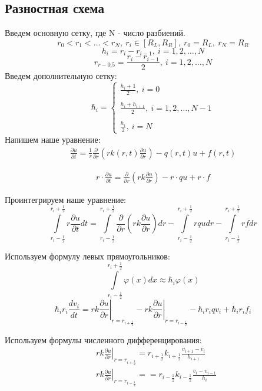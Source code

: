 \subsection{Разностная схема}
Введем основную сетку, где N - число разбиений.
\[ 
  r_0 < r_1 < \dots < r_N,\ r_i \in [R_L, R_R],\ r_0 = R_L,\ r_N = R_R
\]
\[
  h_i =r_i - r_{i-1},\ i=1,2, \dots, N
\]
\[
  r_{r-0.5} = \frac{r_i - r_{i-1}}{2},\ i=1,2, \dots, N
\]
Введем дополнительную сетку:
\[
  \hbar_i = \begin{cases}
    \frac{h_i + 1}{2},\ i = 0 \\ \\
    \frac{h_i + h_{i+1}}{2},\ i = 1, 2, \dots, N-1 \\ \\
    \frac{h_i}{2},\ i = N
  \end{cases}
\]
Напишем наше уравнение:
\begin{align*}
  \frac{\partial u}{\partial t} = \frac{1}{r} \frac{\partial}{\partial r}
  \left ( rk(r, t)\frac{\partial u}{\partial r} \right ) - q(r, t)u + f(r,t)
\end{align*}

\begin{align*}
  r \cdot \frac{\partial u}{\partial t} = \frac{\partial}{\partial r}
  \left ( rk\frac{\partial u}{\partial r} \right ) - r \cdot qu + r \cdot f
\end{align*}

Проинтегрируем наше уравнение:
\[
  \int\limits^{r_i+\frac{1}{2}}_{r_i-\frac{1}{2}} r \frac{\partial u}{\partial t} dt =
  \int\limits^{r_i+\frac{1}{2}}_{r_i-\frac{1}{2}} \frac{\partial}{\partial r} \left ( rk\frac{\partial u}{\partial r} \right ) dr
  - \int\limits^{r_i+\frac{1}{2}}_{r_i-\frac{1}{2}} rqu dr - \int\limits^{r_i+\frac{1}{2}}_{r_i-\frac{1}{2}} rf dr
\]

Используем формулу левых прямоугольников:
\[
  \int\limits^{r_i+\frac{1}{2}}_{r_i-\frac{1}{2}} \varphi(x)dx \approx \hbar_i \varphi(x)
\]
\[
  \hbar_i r_i \frac{d v_i}{dt} = \left . rk \frac{\partial u}{\partial r} \right \vert_{r=r_{i+\frac{1}{2}}}
  - \left . rk \frac{\partial u}{\partial r} \right \vert_{r=r_{i-\frac{1}{2}}} -\hbar_i r_i q v_i + \hbar_i r_i f_i
\]

Используем формулы численного дифференцирования:
\begin{align*}
  &\left . rk \frac{\partial u}{\partial r} \right \vert_{r=r_{i+\frac{1}{2}}} = r_{i + \frac{1}{2}} k_{i + \frac{1}{2}} \frac{v_{i+1}-v_i}{h_{i + 1}} \\
  &\left . rk \frac{\partial u}{\partial r} \right \vert_{r=r_{i-\frac{1}{2}}} = = r_{i - \frac{1}{2}} k_{i - \frac{1}{2}} \frac{v_{i}-v_{i-1}}{h_{i}}
\end{align*}

